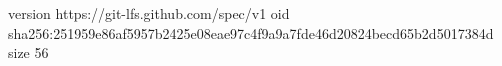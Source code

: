 version https://git-lfs.github.com/spec/v1
oid sha256:251959e86af5957b2425e08eae97c4f9a9a7fde46d20824becd65b2d5017384d
size 56
